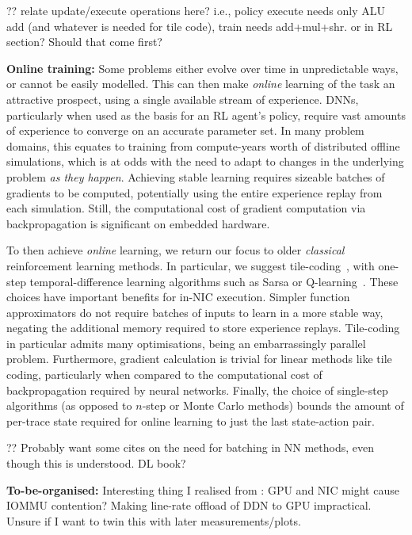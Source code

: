 \documentclass[sigconf,natbib=false]{acmart}
\newcommand{\fakepara}[1]{\noindent\textbf{#1:}}
\begin{document}
?? relate update/execute operations here? i.e., policy execute needs only ALU add (and whatever is needed for tile code), train needs add+mul+shr. or in RL section? Should that come first?

\fakepara{Online training}
Some problems either evolve over time in unpredictable ways, or cannot be easily modelled.
This can then make \emph{online} learning of the task an attractive prospect, using a single available stream of experience.
DNNs, particularly when used as the basis for an RL agent's policy, require vast amounts of experience to converge on an accurate parameter set.
In many problem domains, this equates to training from compute-years worth of distributed offline simulations, which is at odds with the need to adapt to changes in the underlying problem \emph{as they happen}.
Achieving stable learning requires sizeable batches of gradients to be computed, potentially using the entire experience replay from each simulation.
Still, the computational cost of gradient computation via backpropagation is significant on embedded hardware.

To then achieve \emph{online} learning, we return our focus to older \emph{classical} reinforcement learning methods.
In particular, we suggest tile-coding~\cite[pp. \numrange{217}{221}]{RL2E}, with one-step temporal-difference learning algorithms such as Sarsa or Q-learning~\cite[pp. \numrange{129}{132}]{RL2E}.
These choices have important benefits for in-NIC execution.
Simpler function approximators do not require batches of inputs to learn in a more stable way, negating the additional memory required to store experience replays.
Tile-coding in particular admits many optimisations, being an embarrassingly parallel problem.
Furthermore, gradient calculation is trivial for linear methods like tile coding, particularly when compared to the computational cost of backpropagation required by neural networks.
Finally, the choice of single-step algorithms (as opposed to $n$-step or Monte Carlo methods) bounds the amount of per-trace state required for online learning to just the last state-action pair.

?? Probably want some cites on the need for batching in NN methods, even though this is understood. DL book?

\fakepara{To-be-organised}
Interesting thing I realised from \textcite{DBLP:conf/sigcomm/NeugebauerAZAL018}: GPU and NIC might cause IOMMU contention? Making line-rate offload of DDN to GPU impractical. Unsure if I want to twin this with later measurements/plots.
\end{document}
